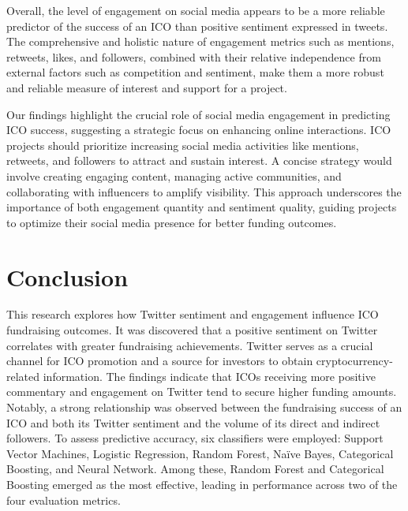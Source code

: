 \documentclass[runningheads]{llncs}
\begin{document}
Overall, the level of engagement on social media appears to be a more reliable predictor of the success of an ICO than positive sentiment expressed in tweets. The comprehensive and holistic nature of engagement metrics such as mentions, retweets, likes, and followers, combined with their relative independence from external factors such as competition and sentiment, make them a more robust and reliable measure of interest and support for a project.

Our findings highlight the crucial role of social media engagement in predicting ICO success, suggesting a strategic focus on enhancing online interactions. ICO projects should prioritize increasing social media activities like mentions, retweets, and followers to attract and sustain interest. A concise strategy would involve creating engaging content, managing active communities, and collaborating with influencers to amplify visibility. This approach underscores the importance of both engagement quantity and sentiment quality, guiding projects to optimize their social media presence for better funding outcomes.

\section{Conclusion}

This research explores how Twitter sentiment and engagement influence ICO fundraising outcomes. It was discovered that a positive sentiment on Twitter correlates with greater fundraising achievements. Twitter serves as a crucial channel for ICO promotion and a source for investors to obtain cryptocurrency-related information. The findings indicate that ICOs receiving more positive commentary and engagement on Twitter tend to secure higher funding amounts. Notably, a strong relationship was observed between the fundraising success of an ICO and both its Twitter sentiment and the volume of its direct and indirect followers. To assess predictive accuracy, six classifiers were employed: Support Vector Machines, Logistic Regression, Random Forest, Naïve Bayes, Categorical Boosting, and Neural Network. Among these, Random Forest and Categorical Boosting emerged as the most effective, leading in performance across two of the four evaluation metrics.
\end{document}
